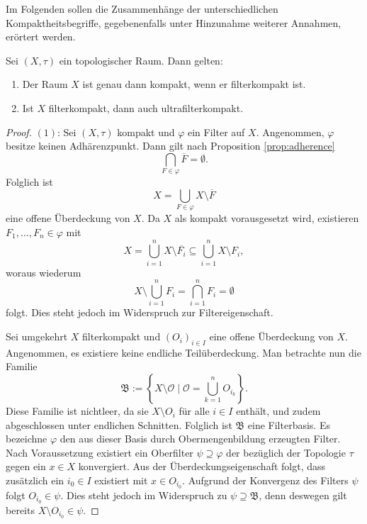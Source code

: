 Im Folgenden sollen die Zusammenhänge der unterschiedlichen Kompaktheitsbegriffe, gegebenenfalls unter Hinzunahme weiterer Annahmen, erörtert werden.

\begin{thm}
\label{thm:compactness}
  Sei $(X,\tau)$ ein topologischer Raum. Dann gelten:
  \begin{enumerate}[(1)]
    \item Der Raum $X$ ist genau dann kompakt, wenn er filterkompakt ist. 
    \item Ist $X$ filterkompakt, dann auch ultrafilterkompakt.
  \end{enumerate}
\end{thm}

\begin{proof}
  $(1)$: 
  Sei $(X,\tau)$ kompakt und $\varphi$ ein Filter auf $X$.
  Angenommen, $\varphi$ besitze keinen Adhärenzpunkt.
  Dann gilt nach Proposition \ref{prop:adherence}
  \begin{displaymath}
    \bigcap_{F \in \varphi} \overline{F} = \emptyset.
  \end{displaymath}
  Folglich ist 
  \begin{displaymath}
    X = \bigcup_{F \in \varphi} X \setminus \overline{F} 
  \end{displaymath}
  eine offene Überdeckung von $X$.
  Da $X$ als kompakt vorausgesetzt wird, existieren $F_1,\dots,F_n \in \varphi$ mit
  \begin{displaymath}
    X = \bigcup_{i = 1}^n X \setminus \overline{F_i} \subseteq \bigcup_{i = 1}^n X \setminus F_i,
  \end{displaymath}
  woraus wiederum
  \begin{displaymath}
    X \setminus \bigcup_{i = 1}^n F_i = \bigcap_{i = 1}^n F_i = \emptyset
  \end{displaymath}
  folgt. 
  Dies steht jedoch im Widerspruch zur Filtereigenschaft.

  Sei umgekehrt $X$ filterkompakt und $(O_i)_{i \in I}$ eine offene Überdeckung von $X$.
  Angenommen, es existiere keine endliche Teilüberdeckung.
  Man betrachte nun die Familie
  \begin{displaymath}
    \mathfrak{B} := \left\{ X \setminus \mathcal{O} \mid \mathcal{O} = \bigcup_{k = 1}^n O_{i_k}\right\}.
  \end{displaymath}
  Diese Familie ist nichtleer, da sie $X \setminus O_i$ für alle $i \in I$ enthält, und zudem abgeschlossen unter endlichen Schnitten.
  Folglich ist $\mathfrak{B}$ eine Filterbasis.
  Es bezeichne $\varphi$ den aus dieser Basis durch Obermengenbildung erzeugten Filter.
  Nach Voraussetzung existiert ein Oberfilter $\psi \supseteq \varphi$ der bezüglich der Topologie $\tau$ gegen ein $x \in X$ konvergiert.
  Aus der Überdeckungseigenschaft folgt, dass zusätzlich ein $i_0 \in I$ existiert mit $x \in O_{i_0}$.
  Aufgrund der Konvergenz des Filters $\psi$ folgt $O_{i_0} \in \psi$.
  Dies steht jedoch im Widerspruch zu $\psi \supseteq \mathfrak{B}$, denn deswegen gilt bereits $X \setminus O_{i_0} \in \psi$.


\end{proof}
